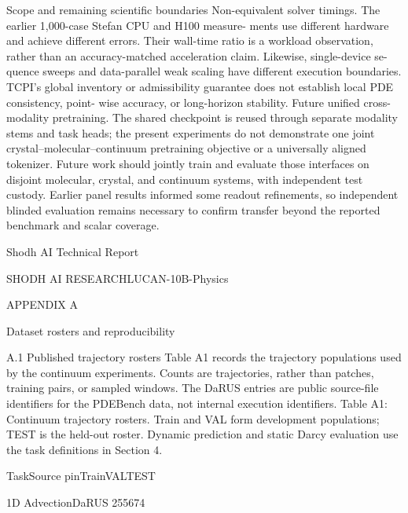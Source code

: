 \documentclass[11pt]{article}
\begin{document}
Scope and remaining scientific boundaries
Non-equivalent solver timings. The earlier 1,000-case Stefan CPU and H100 measure-
ments use different hardware and achieve different errors. Their wall-time ratio is a workload
observation, rather than an accuracy-matched acceleration claim. Likewise, single-device se-
quence sweeps and data-parallel weak scaling have different execution boundaries. TCPI’s
global inventory or admissibility guarantee does not establish local PDE consistency, point-
wise accuracy, or long-horizon stability.
Future unified cross-modality pretraining. The shared checkpoint is reused through
separate modality stems and task heads; the present experiments do not demonstrate one
joint crystal–molecular–continuum pretraining objective or a universally aligned tokenizer.
Future work should jointly train and evaluate those interfaces on disjoint molecular, crystal,
and continuum systems, with independent test custody. Earlier panel results informed
some readout refinements, so independent blinded evaluation remains necessary to confirm
transfer beyond the reported benchmark and scalar coverage.





\noindent Shodh AI Technical Report\par




\noindent SHODH AI RESEARCH\quad LUCAN-10B-Physics\par



APPENDIX A

Dataset rosters and reproducibility

A.1 Published trajectory rosters
Table A1 records the trajectory populations used by the continuum experiments. Counts are
trajectories, rather than patches, training pairs, or sampled windows. The DaRUS entries
are public source-file identifiers for the PDEBench data, not internal execution identifiers.
Table A1: Continuum trajectory rosters. Train and VAL form development populations; TEST
is the held-out roster. Dynamic prediction and static Darcy evaluation use the task definitions in
Section 4.


\noindent Task\quad Source pin\quad Train\quad VAL\quad TEST\par


\noindent 1D Advection\quad DaRUS 255674\par
\end{document}
